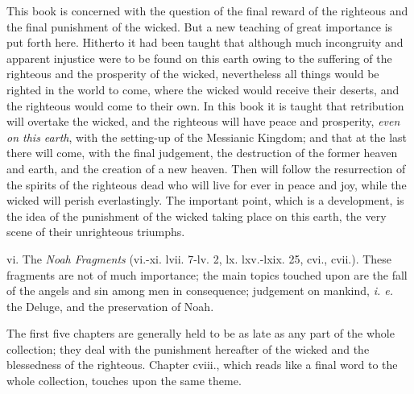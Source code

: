 This book is concerned with the question of the
final reward of the righteous and the final punishment
of the wicked. But a new teaching of great importance
is put forth here. Hitherto it had been taught
that although much incongruity and apparent injustice
were to be found on this earth owing to the
suffering of the righteous and the prosperity of the
wicked, nevertheless all things would be righted in
the world to come, where the wicked would receive
their deserts, and the righteous would come to their
own. In this book it is taught that retribution will
overtake the wicked, and the righteous will have
peace and prosperity, \emph{even on this earth}, with the
setting-up of the Messianic Kingdom; and that at
the last there will come, with the final judgement, the
destruction of the former heaven and earth, and
the creation of a new heaven. Then will follow the
resurrection of the spirits of the righteous dead who
will live for ever in peace and joy, while the wicked
will perish everlastingly. The important point,
which is a development, is the idea of the punishment
of the wicked taking place on this earth, the very
scene of their unrighteous triumphs.

vi. The \emph{Noah Fragments} (vi.-xi. lvii. 7-lv. 2, lx.
lxv.-lxix. 25, cvi., cvii.). These fragments are not
of much importance; the main topics touched upon
are the fall of the angels and sin among men in consequence;
judgement on mankind, \emph{i. e.} the Deluge,
and the preservation of Noah.

The first five chapters are generally held to be as
late as any part of the whole collection; they deal
with the punishment hereafter of the wicked and
the blessedness of the righteous. Chapter cviii., which
reads like a final word to the whole collection, touches
upon the same theme.


